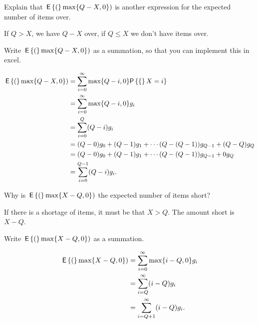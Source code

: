 \begin{question}
  Explain that $\,\mathsf{E}\left\{(\right\} \max\{Q-X, 0\})$ is another expression for the expected number of items over.
  \begin{solution}
    If $Q>X$, we have $Q-X$ over, if $Q\leq X$ we don't have items over. 
  \end{solution}
\end{question}

\begin{question}
  Write $\,\mathsf{E}\left\{(\right\}\max\{Q-X, 0\}) $ as a summation, so that you can implement this in excel.
  \begin{solution}
\begin{equation*}
  \begin{split}
  \E( \max\{Q-X, 0\} )
  &= \sum_{i=0}^\infty \max\{Q-i,0\}\P\{X=i\}\\
  &= \sum_{i=0}^\infty \max\{Q-i,0\}g_i\\
  &= \sum_{i=0}^Q (Q-i) g_i \\
  &= (Q-0) g_0 + (Q-1)g_1+ \cdots (Q-(Q-1))g_{Q-1} + (Q-Q)g_Q\\
  &= (Q-0) g_0 + (Q-1)g_1+ \cdots (Q-(Q-1))g_{Q-1} + 0 g_Q\\
  &= \sum_{i=0}^{Q-1} (Q-i) g_i.
  \end{split}
\end{equation*}
  \end{solution}
\end{question}


\begin{question}
  Why is $ \,\mathsf{E}\left\{(\right\} \max\{X-Q, 0\})$ the expected number of items short?
  \begin{solution}
    If there is a shortage of items, it must be that $X>Q$. The amount short is $X-Q$.
  \end{solution}
\end{question}

\begin{question}
  Write $\,\mathsf{E}\left\{(\right\}\max\{X-Q, 0\}) $ as a summation.
  \begin{solution}
\begin{equation*}
\begin{split}
     \,\mathsf{E}\left\{(\right\}\max\{X-Q, 0\} )
   &= \sum_{i=0}^\infty \max\{i-Q,0\}g_i\\
   &= \sum_{i=Q}^\infty (i-Q) g_i \\
   &= \sum_{i=Q+1}^\infty (i-Q) g_i.
\end{split}
\end{equation*}
\end{solution}
\end{question}


